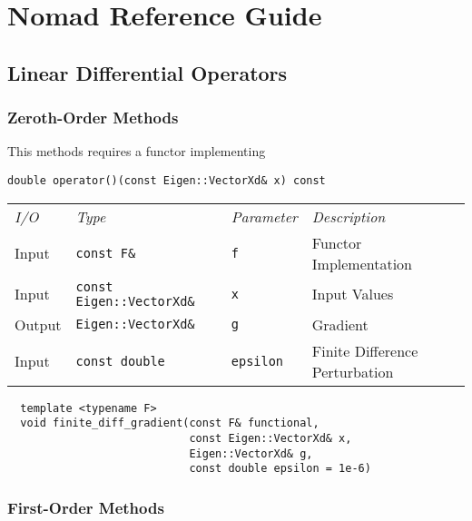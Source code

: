 \chapter{Nomad Reference Guide}

\section{Linear Differential Operators}

\subsection{Zeroth-Order Methods}

This methods requires a functor implementing
%
\begin{verbatim}
double operator()(const Eigen::VectorXd& x) const
\end{verbatim}

\begin{tcolorbox}[colback=white,colframe=gray90, coltitle=black,boxrule=3pt,
fonttitle=\bfseries,title=Finite Difference Gradient]

\begin{tabular}{llll}
\textit{I/O} & \textit{Type} & \textit{Parameter} & \textit{Description} \\
Input & \texttt{const F\&} & \texttt{f} & Functor Implementation \\
Input & \texttt{const Eigen::VectorXd\&} & \texttt{x} & Input Values \\
Output & \texttt{Eigen::VectorXd\&} & \texttt{g} & Gradient \\
Input & \texttt{const double} & \texttt{epsilon} & Finite Difference Perturbation
\end{tabular}

\vspace{5mm}

\begin{verbatim}
  template <typename F>
  void finite_diff_gradient(const F& functional,
                            const Eigen::VectorXd& x,
                            Eigen::VectorXd& g,
                            const double epsilon = 1e-6)
\end{verbatim}

\end{tcolorbox}

\subsection{First-Order Methods}

